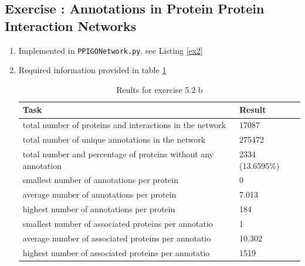 \documentclass[10pt,a4paper]{article}
\newcommand{\exercise}[1]
{
  \stepcounter{subsection}
  \subsection*{Exercise \thesubsection: #1}

}
\begin{document}
\exercise{Annotations in Protein Protein Interaction Networks}
\begin{enumerate}
\item Implemented in \texttt{PPIGONetwork.py}, see Listing \ref{ex2}

\item Required information provided in table \ref{table:ex2a}
\begin{table}[!h]
\caption{Reults for exercise 5.2 b}
\label{table:ex2a}
\begin{tabular}{l l}
Task & Result\\
\hline
total number of proteins and interactions in the network & 17087\\
total number of unique annotations in the network & 275472\\
total number and percentage of proteins without any annotation & 2334 (13.6595\%)\\
smallest number of annotations per protein & 0\\
average number of annotations per protein & 7.013\\
highest number of annotations per protein & 184\\
smallest number of associated proteins per annotatio & 1\\
average number of associated proteins per annotatio & 10.302\\
highest number of associated proteins per annotatio & 1519\\
\end{tabular}
\end{table}


\end{enumerate}
\end{document}
